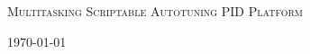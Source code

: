 \begin{titlepage}
\begin{center}

\textsc{\Huge Multitasking Scriptable Autotuning PID Platform}\\[1.5cm]

\vfill

\today

\end{center}
\end{titlepage}
